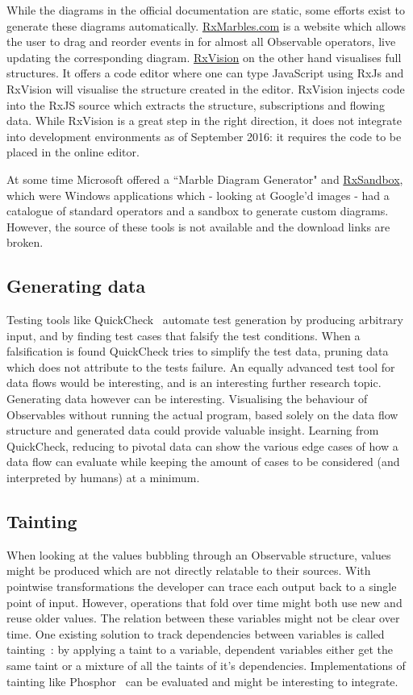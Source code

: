 While the diagrams in the official documentation are static, some
efforts exist to generate these diagrams automatically.  \href{http://RxMarbles.com}
{RxMarbles.com} is a website which allows the user to drag and reorder
events in for almost all Observable operators, live updating the
corresponding diagram.  \href{https://github.com/jaredly/rxvision}{RxVision}
on the other hand visualises full structures.  It offers a code editor
where one can type JavaScript using RxJs and RxVision will visualise the
structure created in the editor.  RxVision injects code into the RxJS
source which extracts the structure, subscriptions and flowing data.
While RxVision is a great step in the right direction, it does not
integrate into development environments as of September 2016:  it
requires the code to be placed in the online editor.

At some time Microsoft offered a ``Marble Diagram Generator" and \href{http://mnajder.blogspot.nl/2010/03/rxsandbox-v1.html}
{RxSandbox}, which were Windows applications which - looking at Google'd
images - had a catalogue of standard operators and a sandbox to generate
custom diagrams.  However, the source of these tools is not available
and the download links are broken.

\subsection{Generating data}%
\label{sec:gen-data} Testing tools like QuickCheck~\cite{quickcheck}
automate test generation by producing arbitrary input, and by finding
test cases that falsify the test conditions.  When a falsification is
found QuickCheck tries to simplify the test data, pruning data which
does not attribute to the tests failure.  An equally advanced test tool
for data flows would be interesting, and is an interesting further
research topic.  Generating data however can be interesting. Visualising
the behaviour of Observables without running the actual program, based
solely on the data flow structure and generated data could provide
valuable insight.  Learning from QuickCheck, reducing to pivotal data
can show the various edge cases of how a data flow can evaluate while
keeping the amount of cases to be considered (and interpreted by humans)
at a minimum.

\subsection{Tainting} When looking at the values bubbling through an
Observable structure, values might be produced which are not directly
relatable to their sources.  With pointwise transformations the
developer can trace each output back to a single point of input.
However, operations that fold over time might both use new and reuse
older values.  The relation between these variables might not be clear
over time.  One existing solution to track dependencies between
variables is called tainting~\cite{bell2015dynamic}:  by applying a
taint to a variable, dependent variables either get the same taint or a
mixture of all the taints of it's dependencies.  Implementations of
tainting like Phosphor~\cite{bell2014phosphor} can be evaluated and
might be interesting to integrate.

